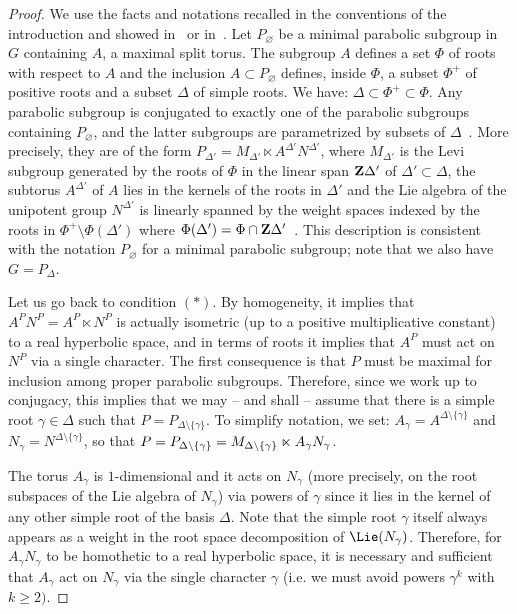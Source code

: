 \begin{proof}
We use the facts and notations recalled in the conventions of the introduction and showed in~\cite[\textsection~14]{BoTi} or in~\cite[\textsection~24.C]{Borel-LAG}. Let $P_\varnothing$ be a minimal parabolic subgroup in $G$ containing $A$, a maximal split torus. The subgroup $A$ defines a set $\Phi$ of roots with respect to $A$ and the inclusion $A \subset P_\varnothing$ defines, inside $\Phi$, a subset $\Phi^+$ of positive roots and a subset $\Delta$ of simple roots. We have: $\Delta \subset \Phi^+ \subset \Phi$. Any parabolic subgroup is conjugated to exactly one of the parabolic subgroups containing $P_\varnothing$, and the latter subgroups are parametrized by subsets of $\Delta$~\cite[21.12]{Borel-LAG}. More precisely, they are of the form $P_{\Delta'}= M_{\Delta'} \ltimes A^{\Delta'}N^{\Delta'}$, where $M_{\Delta'}$ is the Levi subgroup generated by the roots of $\Phi$ in the linear span ${\bf Z}\Delta'$ of $\Delta' \subset \Delta$, the subtorus $A^{\Delta'}$ of $A$ lies in the kernels of the roots in $\Delta'$ and the Lie algebra of the unipotent group $N^{\Delta'}$ is linearly spanned by the weight spaces indexed by the roots in $\Phi^+ \setminus \Phi(\Delta')$ where $\Phi(\Delta') = \Phi \cap {\bf Z}\Delta'$~\cite[21.11]{Borel-LAG}. This description is consistent with the notation $P_\varnothing$ for a minimal parabolic subgroup; note that we also have $G=P_\Delta$.

Let us go back to condition $(*)$. By homogeneity, it implies that $A^PN^P = A^P \ltimes N^P$ is actually isometric (up to a positive multiplicative constant) to a real hyperbolic space, and in terms of roots it implies that $A^P$ must act on $N^P$ via a single character. The first consequence is that $P$ must be maximal for inclusion among proper parabolic subgroups. Therefore, since we work up to conjugacy, this implies that we may -- and shall -- assume that there is a simple root $\gamma \in \Delta$ such that $P = P_{\Delta \setminus \{\gamma \}}$. To simplify notation, we set: $A_\gamma = A^{\Delta \setminus \{\gamma \}}$ and $N_\gamma = N^{\Delta \setminus \{\gamma \}}$, so that $P = P_{\Delta \setminus \{\gamma \}}\linebreak = M_{\Delta \setminus \{\gamma \}} \ltimes A_\gamma N_\gamma$.

The torus $A_\gamma$ is $1$-dimensional and it acts on $N_\gamma$ (more precisely, on the root subspaces of the Lie algebra of $N_\gamma$) via powers of $\gamma$ since it lies in the kernel of any other simple root of the basis $\Delta$. Note that the simple root $\gamma$ itself always appears as a weight in the root space decomposition of $\Lie(N_\gamma)$. Therefore, for $A_\gamma N_\gamma$ to be homothetic to a real hyperbolic space, it is necessary and sufficient that $A_\gamma$ act on $N_\gamma$ via the single character $\gamma$ (i.e. we must avoid powers $\gamma^k$ with $k \geqslant 2)$.


\end{proof}
